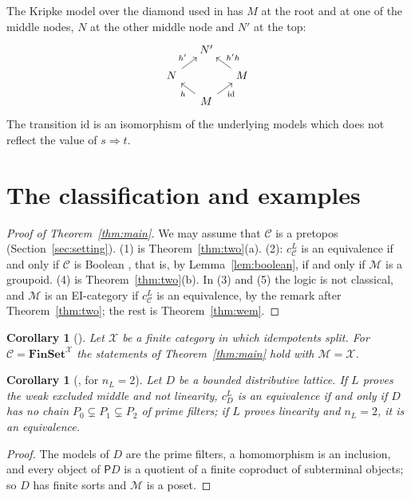 \documentclass[11pt]{amsart}
\newtheorem{cor}[thm]{Corollary}
\theoremstyle{definition}
\newcommand{\Fin}{\mathbf{FinSet}}
\newcommand{\PP}{\mathsf P}
\newcommand{\cX}{\mathcal X}
\newcommand{\cC}{\mathcal C}
\newcommand{\cM}{\mathcal M}
\newcommand{\id}{\mathrm{id}}
\begin{document}
The Kripke model over the diamond used in \cite[Prop.~5.1]{Interm} has
$M$ at the root and at one of the middle nodes, $N$ at the other
middle node and $N'$ at the top:
\[
\begin{tikzcd}[column sep=small,row sep=small]
&N'&\\
N\ar[ur,"h'"]&&M\ar[ul,"h'h"']\\
&M\ar[ul,"h"]\ar[ur,"\id"']&
\end{tikzcd}
\]
The transition $\id$ is an isomorphism of the underlying models which
does not reflect the value of $s\Rightarrow t$.

\section{The classification and examples}

\begin{proof}[Proof of Theorem~\ref{thm:main}]
We may assume that $\cC$ is a pretopos (Section~\ref{sec:setting}).
(1) is Theorem~\ref{thm:two}(a). (2): $c^L_\cC$ is an equivalence if
and only if $\cC$ is Boolean \cite[Thm.~1.1(1)]{Interm}, that is, by
Lemma~\ref{lem:boolean}, if and only if $\cM$ is a groupoid. (4) is
Theorem~\ref{thm:two}(b). In (3) and (5) the logic is not classical,
and $\cM$ is an EI-category if $c^L_\cC$ is an equivalence, by the
remark after Theorem~\ref{thm:two}; the rest is
Theorem~\ref{thm:wem}.
\end{proof}

\begin{cor}[{\cite[Thm.~1.1]{Classify}}]
Let $\cX$ be a finite category in which idempotents split. For
$\cC=\Fin^{\cX}$ the statements of Theorem~\ref{thm:main} hold with
$\cM=\cX$.
\end{cor}

\begin{cor}[{\cite[Thm.~5.1]{Classify}}, {\cite[Thm.~6.3]{Interm}} for $n_L=2$]
Let $D$ be a bounded distributive lattice. If $L$ proves the weak
excluded middle and not linearity, $c^L_D$ is an equivalence if and
only if $D$ has no chain $P_0\subsetneq P_1\subsetneq P_2$ of prime
filters; if $L$ proves
linearity and $n_L=2$, it is an equivalence.
\end{cor}
\begin{proof}
The models of $D$ are the prime filters, a homomorphism is an
inclusion, and every object of $\PP D$ is a quotient of a finite
coproduct of subterminal objects; so $D$ has finite sorts and $\cM$
is a poset.
\end{proof}
\end{document}
